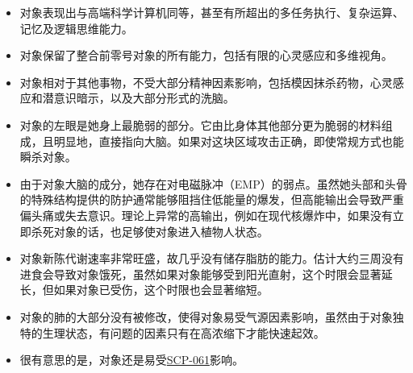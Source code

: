 
\begin{itemize}
\item 对象表现出与高端科学计算机同等，甚至有所超出的多任务执行、复杂运算、记忆及逻辑思维能力。
\item 对象保留了整合前零号对象的所有能力，包括有限的心灵感应和多维视角。
\item 对象相对于其他事物，不受大部分精神因素影响，包括模因抹杀药物，心灵感应和潜意识暗示，以及大部分形式的洗脑。
\end{itemize}


\begin{itemize}
\item 对象的左眼是她身上最脆弱的部分。它由比身体其他部分更为脆弱的材料组成，且明显地，直接指向大脑。如果对这块区域攻击正确，即使常规方式也能瞬杀对象。
\item 由于对象大脑的成分，她存在对电磁脉冲（EMP）的弱点。虽然她头部和头骨的特殊结构提供的防护通常能够阻挡住低能量的爆发，但高能输出会导致严重偏头痛或失去意识。理论上异常的高输出，例如在现代核爆炸中，如果没有立即杀死对象的话，也足够使对象进入植物人状态。
\item 对象新陈代谢速率非常旺盛，故几乎没有储存脂肪的能力。估计大约三周没有进食会导致对象饿死，虽然如果对象能够受到阳光直射，这个时限会显著延长，但如果对象已受伤，这个时限也会显著缩短。
\item 对象的肺的大部分没有被修改，使得对象易受气源因素影响，虽然由于对象独特的生理状态，有问题的因素只有在高浓缩下才能快速起效。
\item 很有意思的是，对象还是易受\hyperref[chap:SCP-061]{SCP-061}影响。
\end{itemize}
